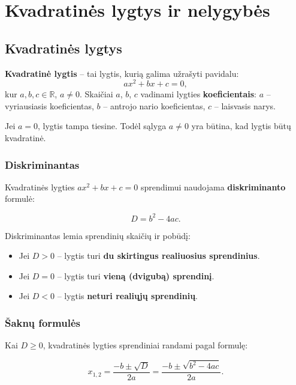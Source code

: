 \section{Kvadratinės lygtys ir nelygybės}

\subsection{Kvadratinės lygtys}

\begin{definition}
\textbf{Kvadratinė lygtis} – tai lygtis, kurią galima užrašyti pavidalu:
\[
ax^2 + bx + c = 0,
\]
kur $a, b, c \in \mathbb{R}$, $a \neq 0$. Skaičiai $a$, $b$, $c$ vadinami lygties \textbf{koeficientais}: $a$ – vyriausiasis koeficientas, $b$ – antrojo nario koeficientas, $c$ – laisvasis narys.
\end{definition}

\begin{remark}
Jei $a = 0$, lygtis tampa tiesine. Todėl sąlyga $a \neq 0$ yra būtina, kad lygtis būtų kvadratinė.
\end{remark}

\subsubsection*{Diskriminantas}

Kvadratinės lygties $ax^2 + bx + c = 0$ sprendimui naudojama \textbf{diskriminanto} formulė:

\[
D = b^2 - 4ac.
\]

Diskriminantas lemia sprendinių skaičių ir pobūdį:

\begin{itemize}
    \item Jei $D > 0$ – lygtis turi \textbf{du skirtingus realiuosius sprendinius}.
    \item Jei $D = 0$ – lygtis turi \textbf{vieną (dvigubą) sprendinį}.
    \item Jei $D < 0$ – lygtis \textbf{neturi realiųjų sprendinių}.
\end{itemize}

\subsubsection*{Šaknų formulės}

Kai $D \geq 0$, kvadratinės lygties sprendiniai randami pagal formulę:

\[
x_{1,2} = \frac{-b \pm \sqrt{D}}{2a} = \frac{-b \pm \sqrt{b^2 - 4ac}}{2a}.
\]

